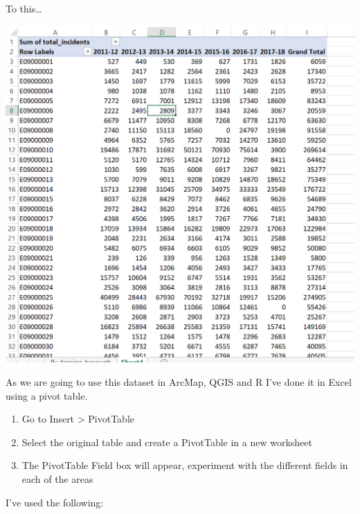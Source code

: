 \documentclass[]{book}
\begin{document}
To this\ldots{}

\begin{center}\includegraphics[width=600pt]{prac1_images/csv_pivot} \end{center}

As we are going to use this dataset in ArcMap, QGIS and R I've done it in Excel using a pivot table.

\begin{enumerate}
\def\labelenumi{\arabic{enumi}.}
\item
  Go to Insert \textgreater{} PivotTable
\item
  Select the original table and create a PivotTable in a new worksheet
\item
  The PivotTable Field box will appear, experiment with the different fields in each of the areas
\end{enumerate}

I've used the following:
\end{document}
